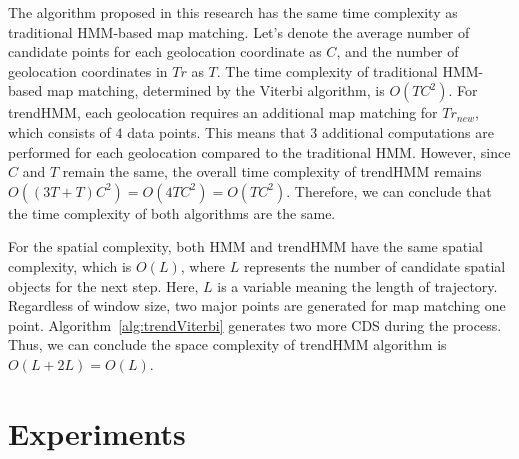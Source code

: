 \documentclass[preprint,12pt]{elsarticle}
\begin{document}
 
	The algorithm proposed in this research has the same time complexity as traditional HMM-based map matching. Let's denote the average number of candidate points for each geolocation coordinate as $C$, and the number of geolocation coordinates in $Tr$ as $T$. The time complexity of traditional HMM-based map matching, determined by the Viterbi algorithm, is $O(TC^2)$.
For trendHMM, each geolocation requires an additional map matching for $Tr_{new}$, which consists of $4$ data points. This means that $3$ additional computations are performed for each geolocation compared to the traditional HMM. However, since $C$ and $T$ remain the same, the overall time complexity of trendHMM remains $O((3T+T)C^2) = O(4TC^2) = O(TC^2)$.
Therefore, we can conclude that the time complexity of both algorithms are the same. 


For the spatial complexity, both HMM and trendHMM have the same spatial complexity, which is $O(L)$, where $L$ represents the number of candidate spatial objects for the next step.
	Here, $L$ is a variable meaning the length of trajectory.
	Regardless of window size, two major points are generated for map matching one point.
	Algorithm~\ref{alg:trendViterbi} generates two more CDS during the process.
	Thus, we can conclude the space complexity of trendHMM algorithm is $O(L + 2L) = O(L)$.


\section{Experiments}
\label{sec:sec4}
\end{document}

